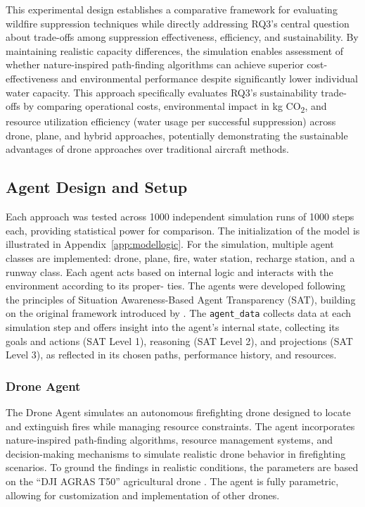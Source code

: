 \documentclass[11pt, a4paper]{article}
\begin{document}
This experimental design establishes a comparative framework for evaluating wildfire suppression techniques while directly addressing RQ3's central question about trade-offs among suppression effectiveness, efficiency, and sustainability. By maintaining realistic capacity differences, the simulation enables assessment of whether nature-inspired path-finding algorithms can achieve superior cost-effectiveness and environmental performance despite significantly lower individual water capacity. This approach specifically evaluates RQ3's sustainability trade-offs by comparing operational costs, environmental impact in kg CO\textsubscript{2}, and resource utilization efficiency (water usage per successful suppression) across drone, plane, and hybrid approaches, potentially demonstrating the sustainable advantages of drone approaches over traditional aircraft methods.


\subsection{Agent Design and Setup}

Each approach was tested across 1000 independent simulation runs of 1000 steps each, providing statistical power for comparison. The initialization of the model is illustrated in Appendix~\ref{app:modellogic}.
For the simulation, multiple agent classes are implemented: drone, plane, fire, water station, recharge station, and a runway class. Each agent acts based on internal logic and interacts with the environment according to its proper-
ties. The agents were developed following the principles of Situation Awareness-Based Agent Transparency (SAT)\citep[see][Figure 1]{chenSituationAwarenessbasedAgent2018}, building on the original framework introduced by \citet*{SAT_first}. The \texttt{agent\_data} collects data at each simulation step and offers insight into the agent’s internal state, collecting its goals and actions (SAT Level 1), reasoning (SAT Level 2), and projections (SAT Level 3), as reflected in its chosen paths, performance history, and resources.

\subsubsection{Drone Agent}
\label{sec:DroneAgent}

The Drone Agent simulates an autonomous firefighting drone designed to locate and extinguish fires while managing resource constraints. The agent incorporates nature-inspired path-finding algorithms, resource management systems, and decision-making mechanisms to simulate realistic drone behavior in firefighting scenarios. To ground the findings in realistic conditions, the parameters are based on the ``DJI AGRAS T50'' agricultural drone \citep{DJIAGRAST50}. The agent is fully parametric, allowing for customization and implementation of other drones.
\end{document}
